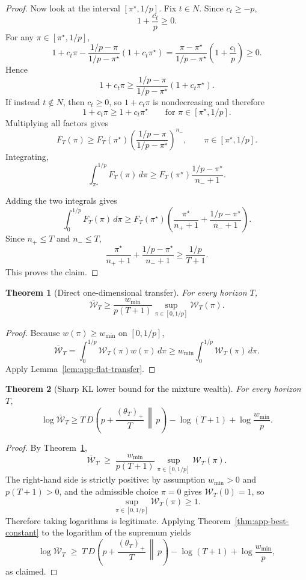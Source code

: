 \documentclass[11pt]{article}
\newtheorem{theorem}{Theorem}
\newcommand{\1}{\mathbf{1}}
\begin{document}
\begin{proof}
Now look at the interval \([\pi^\star,1/p]\). Fix \(t\in N\). Since \(c_t\ge -p\),
\[
1+\frac{c_t}{p}\ge 0.
\]
For any \(\pi\in[\pi^\star,1/p]\),
\[
1+c_t\pi - \frac{1/p-\pi}{1/p-\pi^\star}(1+c_t\pi^\star)
=
\frac{\pi-\pi^\star}{1/p-\pi^\star}\left(1+\frac{c_t}{p}\right)\ge 0.
\]
Hence
\[
1+c_t\pi
\ge
\frac{1/p-\pi}{1/p-\pi^\star}(1+c_t\pi^\star).
\]
If instead \(t\notin N\), then \(c_t\ge 0\), so \(1+c_t\pi\) is nondecreasing and therefore
\[
1+c_t\pi \ge 1+c_t\pi^\star
\qquad\text{for }\pi\in[\pi^\star,1/p].
\]
Multiplying all factors gives
\[
F_T(\pi)\ge F_T(\pi^\star)\left(\frac{1/p-\pi}{1/p-\pi^\star}\right)^{n_-},
\qquad \pi\in[\pi^\star,1/p].
\]
Integrating,
\[
\int_{\pi^\star}^{1/p}F_T(\pi)\,d\pi
\ge
F_T(\pi^\star)\frac{1/p-\pi^\star}{n_-+1}.
\]

Adding the two integrals gives
\[
\int_0^{1/p}F_T(\pi)\,d\pi
\ge
F_T(\pi^\star)\left(
\frac{\pi^\star}{n_++1}
+
\frac{1/p-\pi^\star}{n_-+1}
\right).
\]
Since \(n_+\le T\) and \(n_-\le T\),
\[
\frac{\pi^\star}{n_++1}
+
\frac{1/p-\pi^\star}{n_-+1}
\ge
\frac{1/p}{T+1}.
\]
This proves the claim.
\end{proof}

\begin{theorem}[Direct one-dimensional transfer]
\label{thm:app-direct-transfer}
For every horizon \(T\),
\[
\bar{\mathcal W}_T
\ge
\frac{w_{\min}}{p(T+1)}
\sup_{\pi\in[0,1/p]}\mathcal W_T(\pi).
\]
\end{theorem}

\begin{proof}
Because \(w(\pi)\ge w_{\min}\) on \([0,1/p]\),
\[
\bar{\mathcal W}_T
=
\int_0^{1/p}\mathcal W_T(\pi)w(\pi)\,d\pi
\ge
w_{\min}\int_0^{1/p}\mathcal W_T(\pi)\,d\pi.
\]
Apply Lemma~\ref{lem:app-flat-transfer}.
\end{proof}

\begin{theorem}[Sharp KL lower bound for the mixture wealth]
\label{thm:app-kl-mixture}
For every horizon \(T\),
\[
\log \bar{\mathcal W}_T
\ge
T\,D\!\left(p+\frac{(\theta_T)_+}{T}\,\middle\|\,p\right)
-
\log(T+1)
+
\log\frac{w_{\min}}{p}.
\]
\end{theorem}

\begin{proof}
By Theorem~\ref{thm:app-direct-transfer},
\[
\bar{\mathcal W}_T
\;\ge\;
\frac{w_{\min}}{p(T+1)}
\sup_{\pi\in[0,1/p]}\mathcal W_T(\pi).
\]
The right-hand side is strictly positive: by assumption $w_{\min}>0$ and $p(T+1)>0$, and the admissible choice $\pi=0$ gives $\mathcal W_T(0)=1$, so
\[
\sup_{\pi\in[0,1/p]}\mathcal W_T(\pi)\ge 1.
\]
Therefore taking logarithms is legitimate. Applying Theorem~\ref{thm:app-best-constant} to the logarithm of the supremum yields
\[
\log \bar{\mathcal W}_T
\;\ge\;
T\,D\!\left(p+\frac{(\theta_T)_+}{T}\,\middle\|\,p\right)
-
\log(T+1)
+
\log\frac{w_{\min}}{p},
\]
as claimed.
\end{proof}
\end{document}
